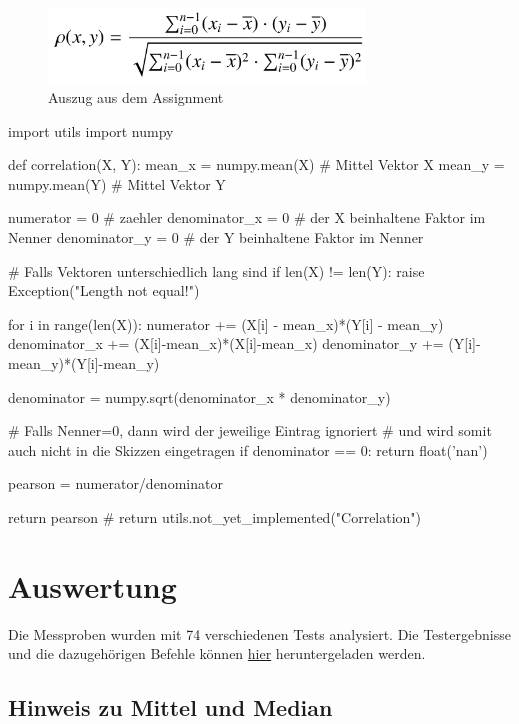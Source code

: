 \documentclass[12pt,a4paper]{article}
\begin{document}
\begin{figure}[hbt!]
	\centering
		\includegraphics[width=0.75\textwidth ]
		{Bilder/a2-pearson-formel.png}
		\caption{Auszug aus dem Assignment}
		\label{fig:Label1}
\end{figure}


\begin{python}
import utils
import numpy


def correlation(X, Y):
    mean_x = numpy.mean(X) # Mittel Vektor X
    mean_y = numpy.mean(Y) # Mittel Vektor Y

    numerator = 0 # zaehler
    denominator_x = 0 # der X beinhaltene Faktor im Nenner
    denominator_y = 0 # der Y beinhaltene Faktor im Nenner

    # Falls Vektoren unterschiedlich lang sind
    if len(X) != len(Y):
        raise Exception("Length not equal!\n")

    for i in range(len(X)):
        numerator += (X[i] - mean_x)*(Y[i] - mean_y)
        denominator_x += (X[i]-mean_x)*(X[i]-mean_x)
        denominator_y += (Y[i]-mean_y)*(Y[i]-mean_y)

    denominator = numpy.sqrt(denominator_x * denominator_y)

    # Falls Nenner=0, dann wird der jeweilige Eintrag ignoriert
    # und wird somit auch nicht in die Skizzen eingetragen
    if denominator == 0:
        return float('nan')

    pearson = numerator/denominator

    return pearson
    # return utils.not_yet_implemented("Correlation")
\end{python}


\newpage
\section{Auswertung}

Die Messproben wurden mit 74 verschiedenen Tests analysiert. 
Die Testergebnisse und die dazugehörigen Befehle können 
\href{https://mega.nz/file/rg4HzTJB#4DSJFln2TZiz9BZ_8xZObXRsGiheQ3Otaf_7wMUAqTQ}
{hier} 
heruntergeladen werden.  


\subsection*{Hinweis zu Mittel und Median}
\end{document}
